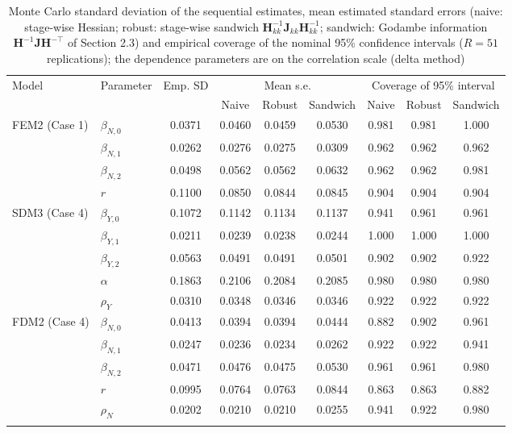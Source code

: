 \begin{table}[!ht]
\footnotesize
\centering
{\color{blue}
\begin{tabular}{llccccccc}
\toprule
Model & Parameter & Emp. SD & \multicolumn{3}{c}{Mean s.e.} & \multicolumn{3}{c}{Coverage of 95\% interval} \\
\cmidrule(lr){4-6} \cmidrule(lr){7-9}
 & & & Naive & Robust & Sandwich & Naive & Robust & Sandwich \\
\midrule
FEM2 (Case 1) & $\beta_{N,0}$ & 0.0371 & 0.0460 & 0.0459 & 0.0530 & 0.981 & 0.981 & 1.000 \\
 & $\beta_{N,1}$ & 0.0262 & 0.0276 & 0.0275 & 0.0309 & 0.962 & 0.962 & 0.962 \\
 & $\beta_{N,2}$ & 0.0498 & 0.0562 & 0.0562 & 0.0632 & 0.962 & 0.962 & 0.981 \\
 & $r$ & 0.1100 & 0.0850 & 0.0844 & 0.0845 & 0.904 & 0.904 & 0.904 \\
\midrule
SDM3 (Case 4) & $\beta_{Y,0}$ & 0.1072 & 0.1142 & 0.1134 & 0.1137 & 0.941 & 0.961 & 0.961 \\
 & $\beta_{Y,1}$ & 0.0211 & 0.0239 & 0.0238 & 0.0244 & 1.000 & 1.000 & 1.000 \\
 & $\beta_{Y,2}$ & 0.0563 & 0.0491 & 0.0491 & 0.0501 & 0.902 & 0.902 & 0.922 \\
 & $\alpha$ & 0.1863 & 0.2106 & 0.2084 & 0.2085 & 0.980 & 0.980 & 0.980 \\
 & $\rho_Y$ & 0.0310 & 0.0348 & 0.0346 & 0.0346 & 0.922 & 0.922 & 0.922 \\
\midrule
FDM2 (Case 4) & $\beta_{N,0}$ & 0.0413 & 0.0394 & 0.0394 & 0.0444 & 0.882 & 0.902 & 0.961 \\
 & $\beta_{N,1}$ & 0.0247 & 0.0236 & 0.0234 & 0.0262 & 0.922 & 0.922 & 0.941 \\
 & $\beta_{N,2}$ & 0.0471 & 0.0476 & 0.0475 & 0.0530 & 0.961 & 0.961 & 0.980 \\
 & $r$ & 0.0995 & 0.0764 & 0.0763 & 0.0844 & 0.863 & 0.863 & 0.882 \\
 & $\rho_N$ & 0.0202 & 0.0210 & 0.0210 & 0.0255 & 0.941 & 0.922 & 0.980 \\
\hhline{=========}
\end{tabular}
}
\caption{Monte Carlo standard deviation of the sequential estimates, mean estimated standard errors (naive: stage-wise Hessian; robust: stage-wise sandwich $\bm{H}_{kk}^{-1}\bm{J}_{kk}\bm{H}_{kk}^{-1}$; sandwich: Godambe information $\bm{H}^{-1}\bm{J}\bm{H}^{-\top}$ of Section 2.3) and empirical coverage of the nominal 95\% confidence intervals ($R=51$ replications); the dependence parameters are on the correlation scale (delta method)}\label{tab:simcoverage}
\end{table}
